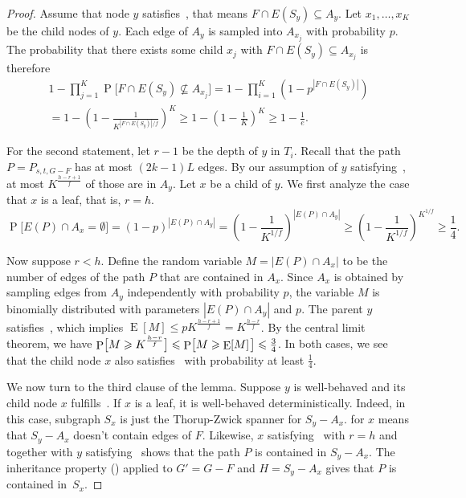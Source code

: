 \documentclass{article}\usepackage[a4paper,margin=20mm]{geometry}
\DeclareMathOperator{\Pb}{P}
\DeclareMathOperator{\Ev}{E}
\newcommand*{\nwspace}{\hspace*{.1em}}
\renewcommand{\geq}{\geqslant}
\renewcommand{\le}{\leqslant}
\begin{document}
\begin{proof}
  Assume that node $y$ satisfies~,
  that means $F\cap E(S_y)\subseteq A_y$.
  Let $x_1,\ldots,x_K$ be the child nodes of $y$.
  Each edge of $A_y$ is sampled into $A_{x_j}$ with probability $p$.
  The probability that there exists some child $x_j$ with
  $F\cap E(S_y) \subseteq A_{x_j}$ is therefore
  \begin{multline*}
    1-\prod_{j=1}^{K}\Pb\!\Big[F\cap E(S_y) \nsubseteq A_{x_j}\Big]
      = 1-\prod_{i=1}^{K} \left(1-p^{|F\cap E(S_y)|} \right)\\
      = 1-\left(1-\frac{1}{K^{|F\cap E(S_y)|/f}} \right)^K
      \geq  1-\left(1-\frac{1}{K}\right)^{K} 
       \geq 1-\frac{1}{e}.
  \end{multline*} 

  For the second statement, let $r{-}1$ be the depth of $y$ in $T_i$.
  Recall that the path $P = P_{s,t,G-F}$ has at most $(2k{-}1)L$ edges.
  By our assumption of $y$ satisfying~, 
  at most $K^{\frac{h-r+1}{f}}$ of those are in $A_y$. 
  Let $x$ be a child of $y$.
  We first analyze the case that $x$ is a leaf, that is, $r=h$.
  \begin{equation*}
    \Pb\!\Big[E(P)\cap A_x=\emptyset \Big] 
      = (1-p)^{|E(P)\cap A_y|}
       = \left( 1- \frac{1}{K^{1/f}} \right)^{|E(P)\cap A_y|}
      \geq \left( 1- \frac{1}{K^{1/f}}\right)^{K^{1/f}}
       \geq \frac{1}{4}.
  \end{equation*}
  
  Now suppose $r < h$.
  Define the random variable $M = |E(P) \cap A_x|$ to be the number of edges of the path $P$
  that are contained in $A_x$.
  Since $A_x$ is obtained by sampling edges from $A_y$ independently with probability $p$,
  the variable $M$ is binomially distributed with parameters $|E(P) \cap A_y|$ and $p$.
  The parent $y$ satisfies~,
  which implies  $\Ev[M] \le p K^{\frac{h-r+1}{f}} = K^{\frac{h-r}{f}}$.
  By the central limit theorem, we have
  $\Pb\!\big[ M \geq K^{\frac{h-r}{f}} \big]
      \le \Pb\!\big[ M \geq \Ev[M] \nwspace \big] \le \frac{3}{4}$.
  In both cases, we see that the child node $x$ also satisfies~ 
  with probability at least $\frac{1}{4}$.
  
  We now turn to the third clause of the lemma. 
  Suppose $y$ is well-behaved and its child node $x$ fulfills~.
  If $x$ is a leaf, it is well-behaved deterministically.
  Indeed, in this case, subgraph $S_x$ is just the Thorup-Zwick spanner for $S_y-A_x$.
   for $x$ means that $S_y-A_x$ doesn't contain edges of $F$.
  Likewise, $x$ satisfying~ with $r = h$ and
  together with $y$ satisfying~
  shows that the path $P$ is contained in $S_y-A_x$.
  The inheritance property () applied to
  $G' = G-F$ and $H = S_y-A_x$ gives that $P$ is contained in~$S_x$.
  

\end{proof}
\end{document}
